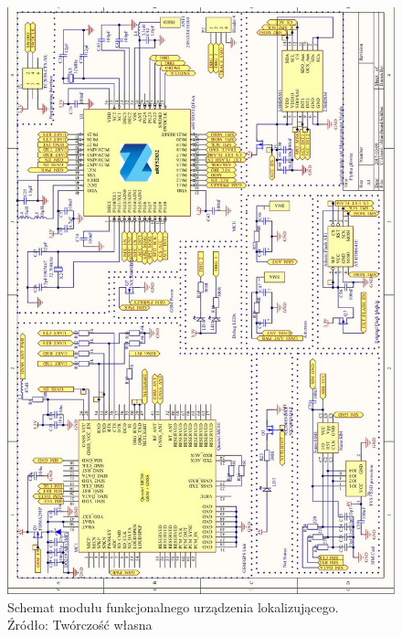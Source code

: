 \begin{figure}[H]
	\centering
	\includegraphics[width=14cm]{img/schematics/mainboard_functional.jpg}
	\caption{Schemat modułu funkcjonalnego urządzenia lokalizującego. \\ Źródło: Twórczość własna}
	\label{fig:image_mainboard_functional_schematic}
\end{figure}

